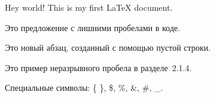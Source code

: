 \documentclass[a4paper, 12pt]{article}
\begin{document}
	
	Hey world! This is my first LaTeX document. 
	
	Это предложение   с   лишними   пробелами в коде.
	
	Это новый абзац, созданный с помощью пустой строки.
	
	Это пример неразрывного пробела в разделе~2.1.4.
	
	Специальные символы: \{ \}, \$, \%, \&, \#, \_.
	
\end{document}
